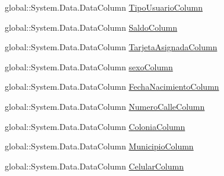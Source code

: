 \begin{DoxyCompactItemize}
\item 
global\-::\-System.\-Data.\-Data\-Column \hyperlink{class_proyecto___integrador__3_1_1ds_usuarios_1_1_usuarios_data_table_a6aae61c3c800781623cde56fd7b1c930}{Tipo\-Usuario\-Column}
\item 
global\-::\-System.\-Data.\-Data\-Column \hyperlink{class_proyecto___integrador__3_1_1ds_usuarios_1_1_usuarios_data_table_a0e728022751a9d5dffae82c0e1b66ade}{Saldo\-Column}
\item 
global\-::\-System.\-Data.\-Data\-Column \hyperlink{class_proyecto___integrador__3_1_1ds_usuarios_1_1_usuarios_data_table_adaf2cdbd83042f6ed4c524deec1469d4}{Tarjeta\-Asignada\-Column}
\item 
global\-::\-System.\-Data.\-Data\-Column \hyperlink{class_proyecto___integrador__3_1_1ds_usuarios_1_1_usuarios_data_table_a900ede3b64e19670a69d7ad762ab1695}{sexo\-Column}
\item 
global\-::\-System.\-Data.\-Data\-Column \hyperlink{class_proyecto___integrador__3_1_1ds_usuarios_1_1_usuarios_data_table_a4c55af9308924a62ce21d93b85837246}{Fecha\-Nacimiento\-Column}
\item 
global\-::\-System.\-Data.\-Data\-Column \hyperlink{class_proyecto___integrador__3_1_1ds_usuarios_1_1_usuarios_data_table_a442769603ef31cf87b2a9fef73b9851e}{Numero\-Calle\-Column}
\item 
global\-::\-System.\-Data.\-Data\-Column \hyperlink{class_proyecto___integrador__3_1_1ds_usuarios_1_1_usuarios_data_table_a9279b22c7066920de7247faff42868b2}{Colonia\-Column}
\item 
global\-::\-System.\-Data.\-Data\-Column \hyperlink{class_proyecto___integrador__3_1_1ds_usuarios_1_1_usuarios_data_table_aa62b66be9729351bbc91dcf69f60f0a0}{Municipio\-Column}
\item 
global\-::\-System.\-Data.\-Data\-Column \hyperlink{class_proyecto___integrador__3_1_1ds_usuarios_1_1_usuarios_data_table_ab00350fd3b8bd2f7f26fdd22da40cf47}{Celular\-Column}

\end{DoxyCompactItemize}
